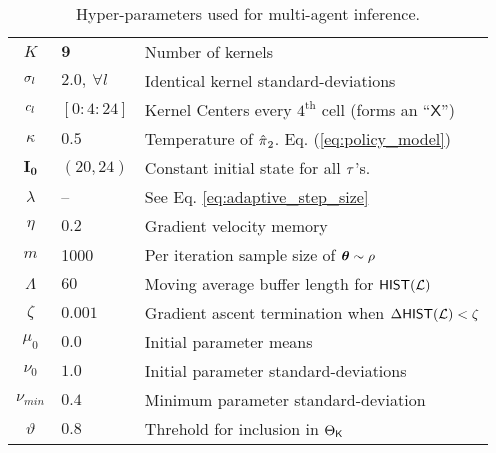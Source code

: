 \begin{table}[htb]
        \centering
        \begin{tabular}{c|l l}
                $K$ & $\mathbf{9}$ & Number of kernels\\
                $\sigma_{l}$ & $2.0,\ \forall l$ & Identical kernel standard-deviations\\
                $c_{l}$ & $[0:4:24]$ & Kernel Centers every $4^\text{th}$ cell (forms an ``$\mathsf{X}$'')\\
                $\kappa$ & $0.5$ & Temperature of $\hat{\pi_{}}_2$. Eq. (\ref{eq:policy_model}) \\
                $\mathbf{I_0}$ & $(20,24)$ & Constant initial state for all $\tau$'s. \\
                $\lambda$ & -- & See Eq. \ref{eq:adaptive_step_size} \\
                $\eta$ & $0.2$ & Gradient velocity memory\\
                $m$ & 1000 & Per iteration sample size of $\boldsymbol{\mathbb{\theta}}\sim \rho$\\
                $\Lambda$ & $60$ & Moving average buffer length for $\mathsf{HIST}(\mathcal{L})$ \\
                $\zeta$ & $0.001$ & Gradient ascent termination when $\Delta\mathsf{HIST}(\mathcal{L}) < \zeta$\\
                $\mu_{0}$ & $0.0$ & Initial parameter means\\
                $\nu_{0}$ & $1.0$ & Initial parameter standard-deviations\\
                $\nu_{min}$ & $0.4$ & Minimum parameter standard-deviation\\
                $\vartheta$ & $\mathbf{0.8}$ & Threhold for inclusion in $\Theta_{\mathsf{K}}$\\
        \end{tabular}
        \caption{Hyper-parameters used for multi-agent inference.}
        \label{table:single_agent_active_hyper_params}
\end{table}

\begin{figure}[htb]
    \begin{center}
    \end{center}
\end{figure}


